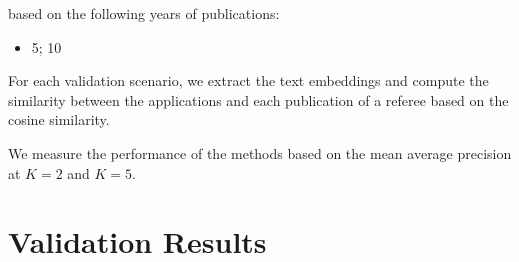 \documentclass[
]{article}
\providecommand{\tightlist}{%
  \setlength{\itemsep}{0pt}\setlength{\parskip}{0pt}}
\begin{document}
based on the following years of publications:

\begin{itemize}
\tightlist
\item
  5; 10
\end{itemize}

For each validation scenario, we extract the text embeddings and compute
the similarity between the applications and each publication of a
referee based on the cosine similarity.

We measure the performance of the methods based on the mean average
precision at \(K=2\) and \(K=5\).

\newpage

\hypertarget{validation-results}{%
\section{Validation Results}\label{validation-results}}
\end{document}
